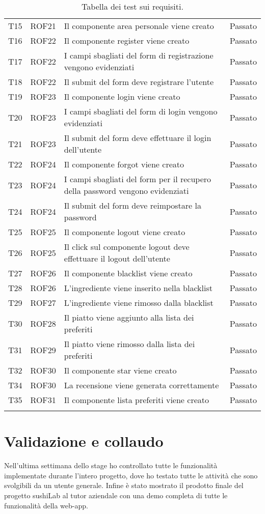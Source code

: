 \begin{center}
\begin{longtable}{ |p{1cm}|p{1.5cm}|p{9cm}|p{1.5cm}|  }
        T15&ROF21&Il componente area personale viene creato&Passato\\
        T16&ROF22&Il componente register viene creato&Passato\\
        T17&ROF22&I campi sbagliati del form di registrazione vengono evidenziati&Passato\\
        T18&ROF22&Il submit del form deve registrare l'utente&Passato\\
        T19&ROF23&Il componente login viene creato&Passato\\
        T20&ROF23&I campi sbagliati del form di login vengono evidenziati&Passato\\
        T21&ROF23&Il submit del form deve effettuare il login dell'utente&Passato\\
        T22&ROF24&Il componente forgot viene creato&Passato\\
        T23&ROF24&I campi sbagliati del form per il recupero della password vengono evidenziati&Passato\\
        T24&ROF24&Il submit del form deve reimpostare la password&Passato\\
        T25&ROF25&Il componente logout viene creato&Passato\\
        T26&ROF25&Il click sul componente logout deve effettuare il logout dell'utente&Passato\\
        T27&ROF26&Il componente blacklist viene creato&Passato\\
        T28&ROF26&L'ingrediente viene inserito nella blacklist&Passato\\
        T29&ROF27&L'ingrediente viene rimosso dalla blacklist&Passato\\
        T30&ROF28&Il piatto viene aggiunto alla lista dei preferiti&Passato\\
        T31&ROF29&Il piatto viene rimosso dalla lista dei preferiti&Passato\\
        T32&ROF30&Il componente star viene creato&Passato\\
        T34&ROF30&La recensione viene generata correttamente&Passato\\
        T35&ROF31&Il componente lista preferiti viene creato&Passato\\
\hline
\caption{\label{tab:tabella dei test sui requisiti}Tabella dei test sui requisiti.}
\end{longtable}
\end{center}
\section{Validazione e collaudo}
Nell'ultima settimana dello stage ho controllato tutte le funzionalità implementate durante l'intero progetto, dove ho testato tutte le attività che sono svolgibili da un utente generale. Infine è stato mostrato il prodotto finale del progetto sushiLab al tutor aziendale con una demo completa di tutte le funzionalità della web-app.